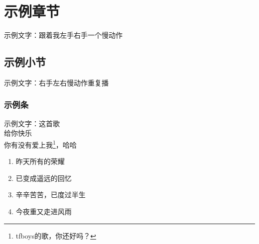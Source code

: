 \chapter{示例章节}
示例文字：跟着我左手右手一个慢动作
\section{示例小节}
示例文字：右手左右慢动作重复播
\subsection{示例条}
示例文字：这首歌\\ 给你快乐\\ 你有没有爱上我\footnote{tfboys的歌，你还好吗？}，哈哈

\begin{enumerate}[leftmargin=24pt]
	\item 昨天所有的荣耀
	\item 已变成遥远的回忆
	\item 辛辛苦苦，已度过半生
	\item 今夜重又走进风雨
\end{enumerate}

